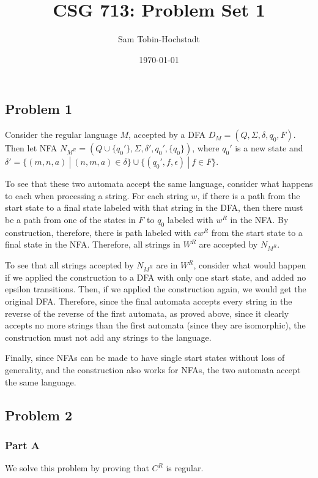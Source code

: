 \documentclass[12pt]
{article}
\title{CSG 713: Problem Set 1}
\author{Sam Tobin-Hochstadt}
\date{\today}
\newcommand{\qed}{\nobreak \ifvmode \relax \else
      \ifdim\lastskip<1.5em \hskip-\lastskip
      \hskip1.5em plus0em minus0.5em \fi \nobreak
      \vrule height0.75em width0.5em depth0.25em\fi}
\begin{document}
\maketitle

\subsection*{Problem 1}

Consider the regular language $M$, accepted by a DFA $D_M =
(Q,\Sigma,\delta,q_0,F)$. Then let NFA $N_{M^R} =
(Q \cup \{q_0'\},\Sigma,\delta',q_0',\{q_0\})$, where $q_0'$ is a new
state and
$\delta' = \{ (m,n,a) ~|~ (n,m,a) \in \delta \} \cup \{
(q_0',f,\epsilon) ~|~ f \in F\}$.

To see that these two automata accept the same language, consider what
happens to each when processing a string.  For each string $w$, if there
is a path from the start state to a final state labeled with that
string in the DFA, then there must be a path from one of the states in
$F$ to $q_0$ labeled with $w^R$ in the NFA.  By construction,
therefore, there is path labeled with $\epsilon w^R$ from the start
state to a final state in the NFA.  Therefore, all strings in $W^R$
are accepted by $N_{M^R}$.  

To see that all strings accepted by $N_{M^R}$ are in $W^R$, consider
what would happen if we applied the construction to a DFA with only
one start state, and added no epsilon transitions.  Then, if we
applied the construction again, we would get the original DFA.
Therefore, since the final automata accepts every string in the
reverse of the reverse of the first automata, as proved above, since
it clearly accepts no more strings than the first automata (since they
are isomorphic), the construction must not add any strings to the
language.  

Finally, since NFAs can be made to have single start states without
loss of generality, and the construction also works for NFAs, the two
automata accept the same language. \qed

\subsection*{Problem 2}

\subsubsection*{Part A}

We solve this problem by proving that $C^R$ is regular.  
\end{document}
